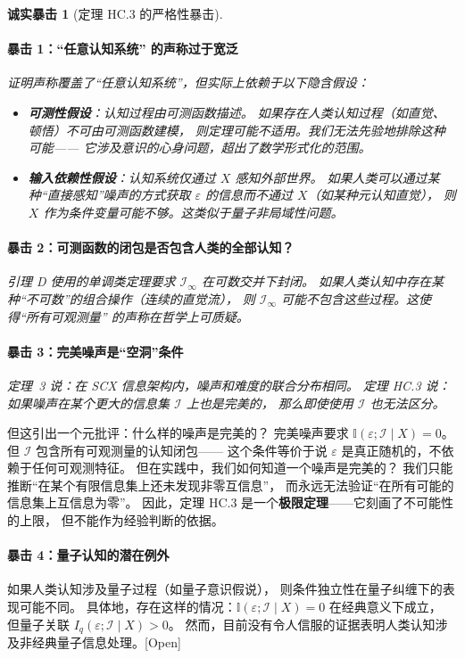 \documentclass[12pt,a4paper]{article}
\newtheorem{critique}[theorem]{诚实暴击}
\newcommand{\openquest}{\textcolor{red!70!black}{\small\textsf{[Open]}}}
\newcommand{\I}{\mathbb{I}}
\newcommand{\cI}{\mathcal{I}}
\begin{document}
\begin{critique}[定理 HC.3 的严格性暴击]

\paragraph{暴击 1：``任意认知系统'' 的声称过于宽泛}
证明声称覆盖了``任意认知系统''，但实际上依赖于以下隐含假设：
\begin{itemize}
    \item \textbf{可测性假设}：认知过程由可测函数描述。
          如果存在人类认知过程（如直觉、顿悟）不可由可测函数建模，
          则定理可能不适用。我们无法先验地排除这种可能——
          它涉及意识的心身问题，超出了数学形式化的范围。
    \item \textbf{输入依赖性假设}：认知系统仅通过 $X$ 感知外部世界。
          如果人类可以通过某种``直接感知''噪声的方式获取
          $\varepsilon$ 的信息而不通过 $X$（如某种元认知直觉），
          则 $X$ 作为条件变量可能不够。这类似于量子非局域性问题。
\end{itemize}

\paragraph{暴击 2：可测函数的闭包是否包含人类的全部认知？}
引理 D 使用的单调类定理要求 $\cI_{\infty}$ 在可数交并下封闭。
如果人类认知中存在某种``不可数''的组合操作（连续的直觉流），
则 $\cI_{\infty}$ 可能不包含这些过程。这使得``所有可观测量''
的声称在哲学上可质疑。

\paragraph{暴击 3：完美噪声是``空洞''条件}
定理~3 说：在 SCX 信息架构内，噪声和难度的联合分布相同。
定理 HC.3 说：如果噪声在某个更大的信息集 $\cI$ 上也是完美的，
那么即使使用 $\cI$ 也无法区分。
\end{critique}

但这引出一个元批评：什么样的噪声是完美的？
完美噪声要求 $\I(\varepsilon; \cI \mid X) = 0$。
但 $\cI$ 包含所有可观测量的认知闭包——
这个条件等价于说 $\varepsilon$ 是真正随机的，不依赖于任何可观测特征。
但在实践中，我们如何知道一个噪声是完美的？
我们只能推断``在某个有限信息集上还未发现非零互信息''，
而永远无法验证``在所有可能的信息集上互信息为零''。
因此，定理 HC.3 是一个\textbf{极限定理}——它刻画了不可能性的上限，
但不能作为经验判断的依据。

\paragraph{暴击 4：量子认知的潜在例外}
如果人类认知涉及量子过程（如量子意识假说），
则条件独立性在量子纠缠下的表现可能不同。
具体地，存在这样的情况：$\I(\varepsilon; \cI \mid X) = 0$ 在经典意义下成立，
但量子关联 $I_q(\varepsilon; \cI \mid X) > 0$。
然而，目前没有令人信服的证据表明人类认知涉及非经典量子信息处理。\openquest
\end{document}
